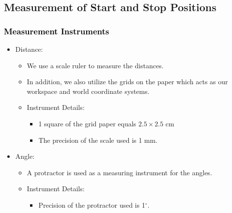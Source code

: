 \documentclass[10pt,a4paper]{article}
\begin{document}
				\subsection{Measurement of Start and Stop Positions}
					\subsubsection{\textcolor{black}{Measurement Instruments}}
						\begin{itemize}
							\item Distance:
							\begin{itemize}
								\item We use a scale ruler to measure the distances.
								\item In addition, we also utilize the grids on the paper which acts as our workspace and world coordinate systems.
								\item Instrument Details:
								\begin{itemize}
									\item 1 square of the grid paper equals $2.5 \times 2.5$ cm
									\item The precision of the scale used is 1 mm.
								\end{itemize}
							\end{itemize}
							\item Angle:
							\begin{itemize}
								\item A protractor is used as a measuring instrument for the angles.
								\item Instrument Details:
								\begin{itemize}
									\item Precision of the protractor used is 1$^\circ$.
								\end{itemize}
							\end{itemize}
						\end{itemize}
\end{document}

